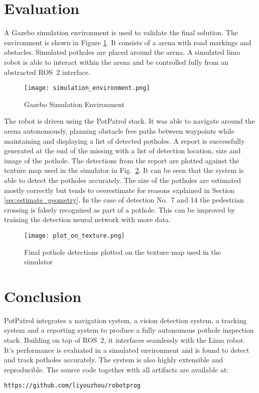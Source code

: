 \documentclass[conference]{IEEEtran}
\begin{document}
\section{Evaluation}

A Gazebo\cite{koenigDesignUseParadigms2004} simulation environment is used to validate the final solution. The environment is shown in Figure \ref{fig:gazebo}. It consists of a arena with road markings and obstacles. Simulated potholes are placed around the arena. A simulated limo robot is able to interact within the arena and be controlled fully from an abstracted ROS~2 interface.

\begin{figure}[ht]
    \centering
    \texttt{[image: simulation\_environment.png]}
    \caption{Gazebo Simulation Environment}
    \label{fig:gazebo}
\end{figure}

The robot is driven using the PotPatrol stack. It was able to navigate around the arena autonomously, planning obstacle free paths between waypoints while maintaining and displaying a list of detected potholes. A report is successfully generated at the end of the missing with a list of detection location, size and image of the pothole. The detections from the report are plotted against the texture map used in the simulator in Fig.~\ref{fig:plot_on_texture}. It can be seen that the system is able to detect the potholes accurately. The size of the potholes are estimated mostly correctly but tends to overestimate for reasons explained in Section \ref{sec:estimate_geometry}. In the case of detection No.~7 and 14 the pedestrian crossing is falsely recognized as part of a pothole. This can be improved by training the detection neural network with more data.

\begin{figure}[ht]
    \centering
    \texttt{[image: plot\_on\_texture.png]}
    \caption{Final pothole detections plotted on the texture map used in the simulator}
    \label{fig:plot_on_texture}
\end{figure}

\section{Conclusion}

PotPatrol integrates a navigation system, a vision detection system, a tracking system and a reporting system to produce a fully autonomous pothole inspection stack. Building on top of ROS~2, it interfaces seamlessly with the Limo robot. It's performance is evaluated in a simulated environment and is found to detect and track potholes accurately. The system is also highly extensible and reproducible. The source code together with all artifacts are available at:

\verb|https://github.com/liyouzhou/robotprog|



\end{document}
